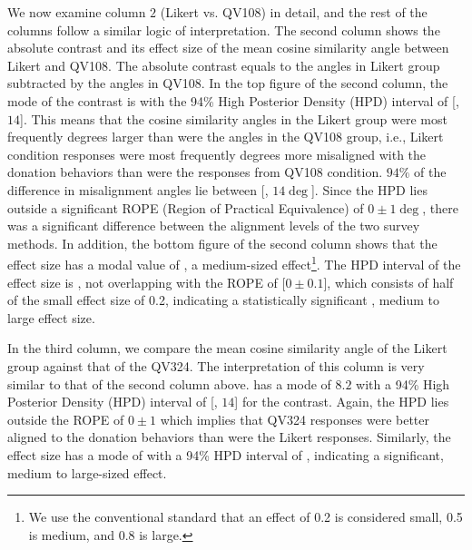 We now examine column $2$ (Likert vs. QV108) in detail, and the rest of the columns follow a similar logic of interpretation. The second column shows the absolute contrast and its effect size of the mean cosine similarity angle between Likert and QV108. The absolute contrast equals to the angles in Likert group subtracted by the angles in QV108. In the top figure of the second column, the mode of the contrast is {} with the 94\% High Posterior Density (HPD) interval of [{}, $14$]. This means that the cosine similarity angles in the Likert group were most frequently {} degrees larger than were the angles in the QV108 group, i.e., Likert condition responses were most frequently {} degrees more misaligned with the donation behaviors than were the responses from QV108 condition. $94\%$ of the difference in misalignment angles lie between [{\change{$2.6 \deg$}}, $14 \deg$]. Since the HPD lies outside a significant ROPE (Region of Practical Equivalence) of $0 \pm 1 \deg$, there was a significant difference between the alignment levels of the two survey methods. In addition, the bottom figure of the second column shows that the effect size has a modal value of {}, a medium-sized effect\footnote{We use the conventional standard that an effect of 0.2 is considered small, 0.5 is medium, and 0.8 is large.}. The HPD interval of the effect size is {\change{[$0.17$, $1$]}}, not overlapping with the ROPE of [$0 \pm 0.1$], which consists of half of the small effect size of 0.2, indicating a statistically significant {}, medium to large effect size.

In the third column, we compare the mean cosine similarity angle of the Likert group
against that of the QV324. The interpretation of this column is very similar to that of the second column above. {} has a mode of $8.2$ with a 94\% High Posterior Density (HPD) interval of [{}, $14$] for the contrast. Again, the HPD lies outside the ROPE of $0 \pm 1$ which implies that QV324 responses were better aligned to the donation behaviors than were the Likert responses. Similarly, the effect size has a mode of {} with a 94\% HPD interval of {\change{[$0.16$, $0.96$]}}, indicating a significant, medium to large-sized effect.

